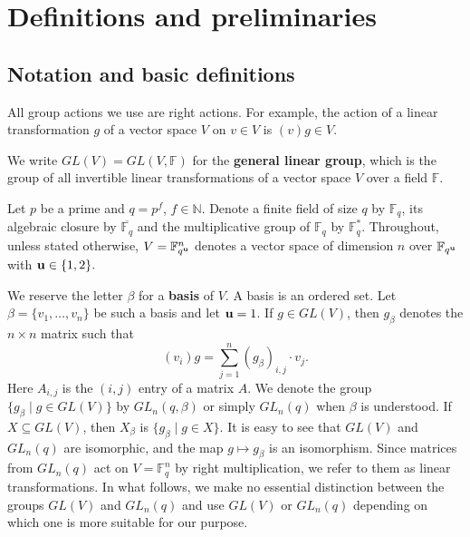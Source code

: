 \chapter{Definitions and preliminaries}

\section{Notation and basic definitions}
\label{secnot}

All group actions we use are right actions. For example, the action of a linear transformation $g$ of a vector space $V$ on $v \in V$ is $(v)g \in V.$


We write $GL(V)=GL(V, \mathbb{F})$ for the {\bf general linear group}, which is the group of all invertible linear transformations of  a vector space $V$ over a field $\mathbb{F}.$ 

 Let $p$ be a prime and $q=p^f$,  $f \in \mathbb{N}$. Denote a finite field of size $q$ by $\mathbb{F}_q$, its algebraic closure by $\overline{\mathbb{F}_q}$ and the multiplicative group of $\mathbb{F}_q$ by $\mathbb{F}_q^*.$ 
Throughout, unless stated otherwise, $V=\mathbb{F}_{q^{\bf u}}^n$ denotes a vector space of dimension $n$ over $\mathbb{F}_{q^{\bf u}}$ with ${\bf u} \in \{1,2\}.$  



We reserve the letter $\beta$ for a {\bf basis} of $V$. A basis is an ordered set. Let $\beta =\{v_1, \ldots, v_n\}$ be such a basis and let ${\bf u}=1$. If $g \in GL(V)$, then $g_{\beta}$ denotes the $n \times n$ matrix such that 
$$(v_i)g=\sum_{j=1}^{n} (g_{\beta})_{i,j} \cdot v_j.$$ Here $A_{i,j}$ is the $(i,j)$ entry of a matrix $A$.   We denote the group $\{g_{\beta} \mid g \in GL(V)\}$ by $GL_n(q, \beta)$ or simply $GL_n(q)$ when $\beta$ is understood. If $X \subseteq GL(V)$, then $X_{\beta}$ is $\{g_{\beta} \mid g \in X \}.$  It is easy to see that  $GL(V)$ and $GL_n(q)$ are isomorphic, and the map $g \mapsto g_{\beta}$ is an isomorphism. Since matrices from $GL_n(q)$ act on $V=\mathbb{F}_q^n$ by right multiplication, we  refer to them as linear transformations. In what
follows, we make no essential distinction between the groups $GL(V)$ and $GL_n(q)$ and use $GL(V)$ or $GL_n(q)$ depending on which one is more suitable for our purpose.  



